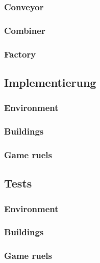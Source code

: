 \subsubsection*{Conveyor}
\subsubsection*{Combiner}
\subsubsection*{Factory}


\subsection{Implementierung}

\subsubsection*{Environment}

\subsubsection*{Buildings}

\subsubsection*{Game ruels}



\subsection{Tests}

\subsubsection*{Environment}

\subsubsection*{Buildings}

\subsubsection*{Game ruels}